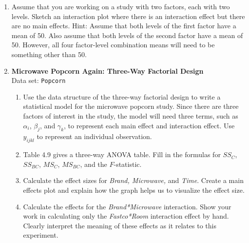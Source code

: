 \documentclass[
]{report}
\begin{document}
\begin{enumerate}
  \item Assume that you are working on a study with two factors, each with two levels. Sketch an interaction plot where there is an interaction effect but there are no main effects. Hint: Assume that both levels of the first factor have a mean of 50. Also assume that both levels of the second factor have a mean of 50. However, all four factor-level combination means will need to be something other than 50.

  \item \textbf{Microwave Popcorn Again: Three-Way Factorial Design}\\
  Data set: \texttt{Popcorn}
  \begin{enumerate}
    \item Use the data structure of the three-way factorial design to write a statistical model for the microwave popcorn study. Since there are three factors of interest in the study, the model will need three terms, such as $\alpha_i$, $\beta_j$, and $\gamma_k$, to represent each main effect and interaction effect. Use $y_{ijkl}$ to represent an individual observation.
    \item Table 4.9 gives a three-way ANOVA table. Fill in the formulas for $SS_C$, $SS_{BC}$, $MS_C$, $MS_{BC}$, and the $F$-statistic.
    \item Calculate the effect sizes for \textit{Brand, Microwave,} and \textit{Time}. Create a main effects plot and explain how the graph helps us to visualize the effect size.
    \item Calculate the effects for the \textit{Brand*Microwave} interaction. Show your work in calculating only the \textit{Fastco*Room} interaction effect by hand. Clearly interpret the meaning of these effects as it relates to this experiment.
  \end{enumerate}


\end{enumerate}
\end{document}

